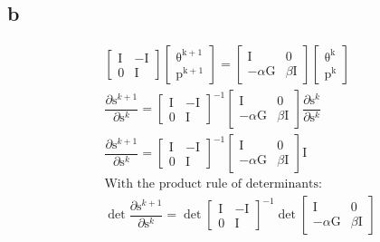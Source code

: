\documentclass[12pt,letterpaper]{article} %
\newcommand{\bs}[1]{\bm{\mathrm{#1}}} %
\begin{document}
\subsection{b}
\begin{align*}
&\begin{bmatrix} \bs{I} & \bs{-I}\\ \bs{0} & \bs{I} \end{bmatrix} \begin{bmatrix} \bs{\theta^{k+1}}\\ \bs{p^{k+1}}\end{bmatrix} = \begin{bmatrix} \bs{I} & \bs{0}\\ -\alpha\bs{G} & \beta\bs{I}\end{bmatrix} \begin{bmatrix} \bs{\theta^{k}}\\ \bs{p^{k}}\end{bmatrix}\\
&\dfrac{\partial \bs{s}^{k+1}}{\partial \bs{s}^{k}} = \begin{bmatrix} \bs{I} & \bs{-I}\\ \bs{0} & \bs{I} \end{bmatrix}^{-1} \begin{bmatrix} \bs{I} & \bs{0}\\ -\alpha\bs{G} & \beta\bs{I}\end{bmatrix} \dfrac{\partial \bs{s}^{k}}{\partial \bs{s}^{k}}\\
&\dfrac{\partial \bs{s}^{k+1}}{\partial \bs{s}^{k}} = \begin{bmatrix} \bs{I} & \bs{-I}\\ \bs{0} & \bs{I} \end{bmatrix}^{-1} \begin{bmatrix} \bs{I} & \bs{0}\\ -\alpha\bs{G} & \beta\bs{I}\end{bmatrix} \bs{I}\\
&\text{With the product rule of determinants:}\\
&\det \dfrac{\partial \bs{s}^{k+1}}{\partial \bs{s}^{k}} = \det\begin{bmatrix} \bs{I} & \bs{-I}\\ \bs{0} & \bs{I} \end{bmatrix}^{-1} \det\begin{bmatrix} \bs{I} & \bs{0}\\ -\alpha\bs{G} & \beta\bs{I}\end{bmatrix} \\

\end{align*}
\end{document}
